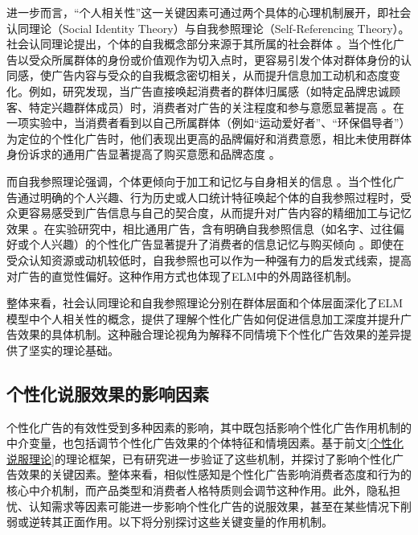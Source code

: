 进一步而言，“个人相关性”这一关键因素可通过两个具体的心理机制展开，即社会认同理论（Social Identity Theory）与自我参照理论（Self-Referencing Theory）。社会认同理论提出，个体的自我概念部分来源于其所属的社会群体 \citep{rogers1977self}。当个性化广告以受众所属群体的身份或价值观作为切入点时，更容易引发个体对群体身份的认同感，使广告内容与受众的自我概念密切相关，从而提升信息加工动机和态度变化。例如，研究发现，当广告直接唤起消费者的群体归属感（如特定品牌忠诚顾客、特定兴趣群体成员）时，消费者对广告的关注程度和参与意愿显著提高 \citep{mols2012makes}。在一项实验中，当消费者看到以自己所属群体（例如“运动爱好者”、“环保倡导者”）为定位的个性化广告时，他们表现出更高的品牌偏好和消费意愿，相比未使用群体身份诉求的通用广告显著提高了购买意愿和品牌态度 \citep{white2013and}。

而自我参照理论强调，个体更倾向于加工和记忆与自身相关的信息 \citep{rogers1977self}。当个性化广告通过明确的个人兴趣、行为历史或人口统计特征唤起个体的自我参照过程时，受众更容易感受到广告信息与自己的契合度，从而提升对广告内容的精细加工与记忆效果 \citep{burnkrant1989self}。在实验研究中，相比通用广告，含有明确自我参照信息（如名字、过往偏好或个人兴趣）的个性化广告显著提升了消费者的信息记忆与购买倾向 \citep{summers2016audience}。即使在受众认知资源或动机较低时，自我参照也可以作为一种强有力的启发式线索，提高对广告的直觉性偏好。这种作用方式也体现了ELM中的外周路径机制。

整体来看，社会认同理论和自我参照理论分别在群体层面和个体层面深化了ELM模型中个人相关性的概念，提供了理解个性化广告如何促进信息加工深度并提升广告效果的具体机制。这种融合理论视角为解释不同情境下个性化广告效果的差异提供了坚实的理论基础。


\subsection{个性化说服效果的影响因素}
个性化广告的有效性受到多种因素的影响，其中既包括影响个性化广告作用机制的中介变量，也包括调节个性化广告效果的个体特征和情境因素。基于前文\ref{个性化说服理论}的理论框架，已有研究进一步验证了这些机制，并探讨了影响个性化广告效果的关键因素。整体来看，相似性感知是个性化广告影响消费者态度和行为的核心中介机制，而产品类型和消费者人格特质则会调节这种作用。此外，隐私担忧、认知需求等因素可能进一步影响个性化广告的说服效果，甚至在某些情况下削弱或逆转其正面作用。以下将分别探讨这些关键变量的作用机制。

